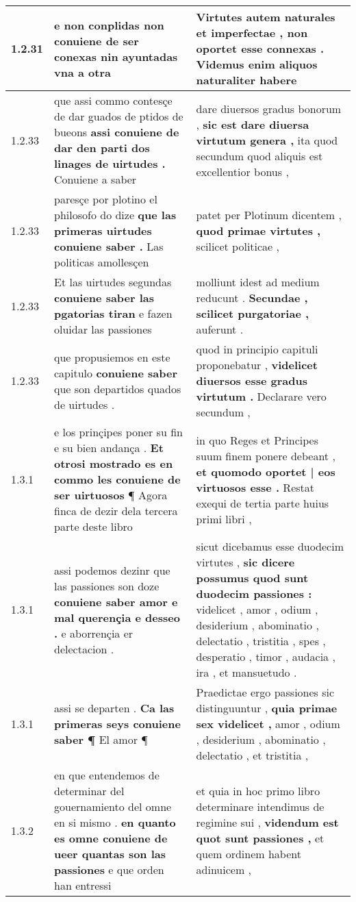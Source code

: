 \begin{tabular}{|p{1cm}|p{6.5cm}|p{6.5cm}|}
1.2.31 & e non conplidas \textbf{ non conuiene de ser conexas } nin ayuntadas vna a otra & Virtutes autem naturales et imperfectae , \textbf{ non oportet esse connexas . } Videmus enim aliquos naturaliter habere \\\hline
1.2.33 & que assi commo contesçe de dar guados de ptidos de bueons \textbf{ assi conuiene de dar den parti dos linages de uirtudes . } Conuiene a saber & dare diuersos gradus bonorum , \textbf{ sic est dare diuersa virtutum genera , } ita quod secundum quod aliquis est excellentior bonus , \\\hline
1.2.33 & paresçe por plotino el philosofo do dize \textbf{ que las primeras uirtudes conuiene saber . } Las politicas amollesçen & patet per Plotinum dicentem , \textbf{ quod primae virtutes , } scilicet politicae , \\\hline
1.2.33 & Et las uirtudes segundas \textbf{ conuiene saber las pgatorias tiran } e fazen oluidar las passiones & molliunt idest ad medium reducunt . \textbf{ Secundae , scilicet purgatoriae , } auferunt . \\\hline
1.2.33 & que propusiemos en este capitulo \textbf{ conuiene saber } que son departidos quados de uirtudes . & quod in principio capituli proponebatur , \textbf{ videlicet diuersos esse gradus virtutum . } Declarare vero secundum , \\\hline
1.3.1 & e los prinçipes poner su fin e su bien andança . \textbf{ Et otrosi mostrado es en commo les conuiene de ser uirtuosos } ¶ Agora finca de dezir dela tercera parte deste libro & in quo Reges et Principes suum finem ponere debeant , \textbf{ et quomodo oportet | eos virtuosos esse . } Restat exequi de tertia parte huius primi libri , \\\hline
1.3.1 & assi podemos dezinr que las passiones son doze \textbf{ conuiene saber amor e mal querençia e desseo . } e aborrençia er delectacion . & sicut dicebamus esse duodecim virtutes , \textbf{ sic dicere possumus quod sunt duodecim passiones : } videlicet , amor , odium , desiderium , abominatio , delectatio , tristitia , spes , desperatio , timor , audacia , ira , et mansuetudo . \\\hline
1.3.1 & assi se departen . \textbf{ Ca las primeras seys conuiene saber ¶ } El amor ¶ & Praedictae ergo passiones sic distinguuntur , \textbf{ quia primae sex videlicet , } amor , odium , desiderium , abominatio , delectatio , et tristitia , \\\hline
1.3.2 & en que entendemos de determinar del gouernamiento del omne en si mismo . \textbf{ en quanto es omne conuiene de ueer quantas son las passiones } e que orden han entressi & et quia in hoc primo libro determinare intendimus de regimine sui , \textbf{ videndum est quot sunt passiones , } et quem ordinem habent adinuicem , \\\hline

\end{tabular}
